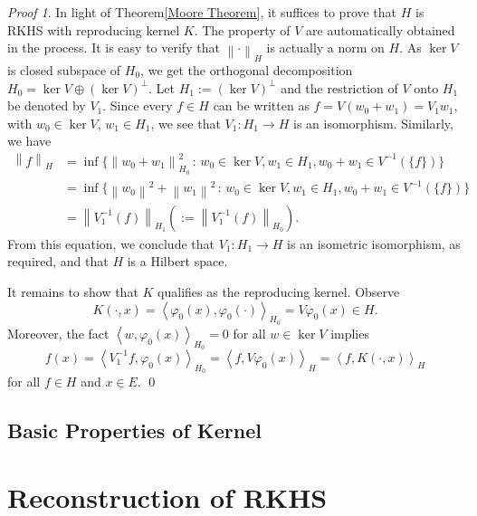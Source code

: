\documentclass[a4paper,12pt]{article}
\theoremstyle{remark}
\newtheorem*{prf}{Proof}
\theoremstyle{definition}
\theoremstyle{definition}
\theoremstyle{definition}
\newcommand{\ip}[2]{\left<#1, #2 \right>}
\newcommand{\norm}[1]{\left\| #1 \right\|}
\begin{document}
\begin{prf}
	In light of Theorem\ref{Moore Theorem}, it suffices to prove that \( H \) is RKHS with reproducing kernel \( K \). The property of \( V \) are automatically obtained in the process. It is easy to verify that \( \norm{\cdot }_H \) is actually a norm on \( H \). As \( \ker V \) is closed subspace of \( H_0 \), we get the orthogonal decomposition \( H_0 = \ker V \oplus \left( \ker V \right)^{\perp} \). Let \( H_1 := \left( \ker V \right)^{\perp} \) and the restriction of \( V \) onto \( H_1 \) be denoted by \( V_1 \). Since every \( f \in H \) can be written as \( f = V(w_0+w_1) = V_1 w_1 \), with \( w_0 \in \ker V \), \( w_1 \in H_1 \),  we see that \( V_1 :H_1 \to H \) is an isomorphism. Similarly, we have
	\begin{equation*}
		\begin{aligned}
			\norm{f}_H
			 & = \inf \{ \norm{w_0+w_1}_{H_0} ^2 \,:\, w_0 \in \ker V, w_1 \in H_1, w_0 + w_1 \in V^{-1}(\{f\})\}     \\
			 & = \inf \{ \norm{w_0}^2 + \norm{w_1}^2 \,:\, w_0 \in \ker V, w_1 \in H_1, w_0 + w_1 \in V^{-1}(\{f\})\} \\
			 & = \norm{V_1^{-1}(f)}_{H_1} \left( := \norm{V_1^{-1}(f)}_{H_0} \right).
		\end{aligned}
	\end{equation*}
	From this equation, we conclude that \( V_1 :H_1 \to H \) is an isometric isomorphism, as required, and that \( H \) is a Hilbert space.

	It remains to show that \( K \) qualifies as the reproducing kernel. Observe
	\begin{equation*}
		K(\cdot ,x) = \ip{\varphi_0(x)}{\varphi_0(\cdot )}_{H_0} = V \varphi_0(x)\in H.
	\end{equation*}
	Moreover, the fact \( \ip{w}{\varphi_0(x)}_{H_0} = 0 \) for all \( w \in \ker V \) implies
	\begin{equation*}
		f(x) = \ip{V_1^{-1}f}{\varphi_0(x)}_{H_0} = \ip{f}{V \varphi_0(x)}_H = \ip{f}{K(\cdot ,x)}_H
	\end{equation*}
	for all \( f \in H \) and \( x \in E \).
	\qed\end{prf}

\subsection{Basic Properties of Kernel}

\section{Reconstruction of RKHS}
\end{document}
